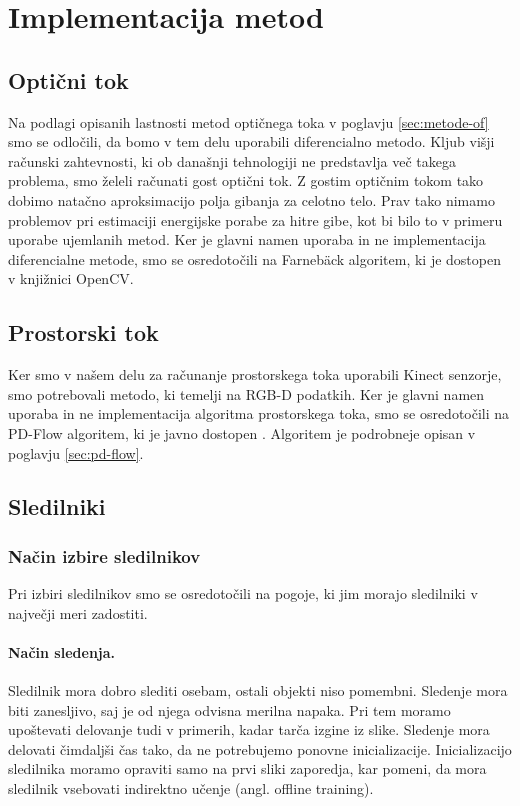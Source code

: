 \section{Implementacija metod}
\subsection{Optični tok}
Na podlagi opisanih lastnosti metod optičnega toka v poglavju \ref{sec:metode-of} smo se odločili, da bomo v tem delu uporabili diferencialno metodo. Kljub višji računski zahtevnosti, ki ob današnji tehnologiji ne predstavlja več takega problema, smo želeli računati gost optični tok. Z gostim optičnim tokom tako dobimo natačno aproksimacijo polja gibanja za celotno telo. Prav tako nimamo problemov pri estimaciji energijske porabe za hitre gibe, kot bi bilo to v primeru uporabe ujemlanih metod. Ker je glavni namen uporaba in ne implementacija diferencialne metode, smo se osredotočili na Farneb{\"a}ck algoritem, ki je dostopen v knjižnici OpenCV.

\subsection{Prostorski tok}
Ker smo v našem delu za računanje prostorskega toka uporabili Kinect senzorje, smo potrebovali metodo, ki temelji na RGB-D podatkih. Ker je glavni namen uporaba in ne implementacija algoritma prostorskega toka, smo se osredotočili na PD-Flow algoritem, ki je javno dostopen \cite{jaimez2015primal}. Algoritem je podrobneje opisan v poglavju \ref{sec:pd-flow}.

\subsection{Sledilniki}
\subsubsection{Način izbire sledilnikov}\label{sec:pogoji-sledilnikov}
Pri izbiri sledilnikov smo se osredotočili na pogoje, ki jim morajo sledilniki v največji meri zadostiti.

\paragraph{Način sledenja.} Sledilnik mora dobro slediti osebam, ostali objekti niso pomembni. Sledenje mora biti zanesljivo, saj je od njega odvisna merilna napaka. Pri tem moramo upoštevati delovanje tudi v primerih, kadar tarča izgine iz slike. Sledenje mora delovati čimdaljši čas tako, da ne potrebujemo ponovne inicializacije. Inicializacijo sledilnika moramo opraviti samo na prvi sliki zaporedja, kar pomeni, da mora sledilnik vsebovati indirektno učenje (angl. offline training).

